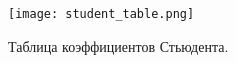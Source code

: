 
\begin{figure}[ht]
	\centering
	\texttt{[image: student\_table.png]}
	\caption{Таблица коэффициентов Стьюдента.}
	\label{fig:TestObjC}
\end{figure}
